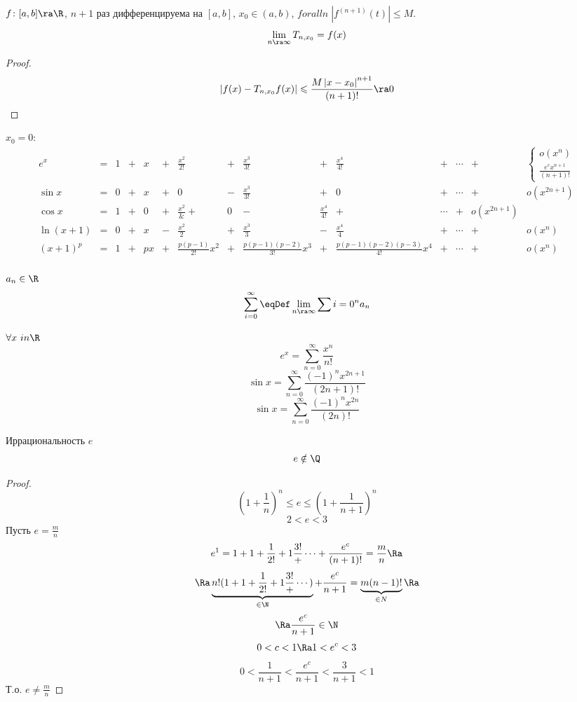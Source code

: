 \begin{conseq}
$f\colon [a, b] \ra \R$, $n+1$ раз дифференцируема на $[a, b]$, $x_0 \in (a, b)$, $forall n\; \left|f^{(n+1)} (t)\right| \leqslant M$.
$$\lim_{n\ra\infty} T_{n, x_0} = f(x)$$
\end{conseq}
\begin{proof}
$$\left|f(x) - T_{n, x_0} f(x)\right| \leqslant \frac{M \left|x-x_0\right|^{n+1}}{(n+1)!} \ra 0$$
\end{proof}

$x_0 = 0$:
$$
\begin{matrix}
e^x &=& 1 &+& x &+& \frac{x^2}{2!} &+& \frac{x^3}{3!} &+& \frac{x^4}{4!} &+& \cdots &+& \begin{cases}o(x^n) \\ \frac{e^cx^{n+1}}{(n+1)!}\end{cases} \\
\sin x &=& 0 &+& x &+& 0 &-& \frac{x^3}{3!} &+& 0 &+& \cdots &+& o(x^{2n+1}) \\
\cos x &=& 1 &+& 0 &+& \frac{x^2} &+& 0 &-& \frac{x^4}{4!} &+& \cdots &+& o(x^{2n+1}) \\

\ln (x+1) &=& 0 &+& x &-& \frac{x^2}2 &+& \frac{x^3}3 &-& \frac{x^4}4 &+& \cdots &+& o(x^n) \\
(x+1)^p &=& 1 &+& px &+& \frac{p(p-1)}{2!}x^2 &+& \frac{p(p-1)(p-2)}{3!}x^3 &+& \frac{p(p-1)(p-2)(p-3)}{4!}x^4 &+& \cdots &+& o(x^n) \\
\end{matrix}
$$

\begin{Def}
$a_n \in \R$
$$\sum_{i=0}^\infty \eqDef \lim_{n\ra\infty} \sum{i=0}^n a_n$$
\end{Def}

\begin{conseq}
$\forall x\ in \R\;$
$$e^x = \sum_{n=0}^\infty \frac{x^n}{n!}$$
$$\sin x = \sum_{n=0}^\infty \frac{(-1)^n x^{2n+1}}{(2n+1)!}$$
$$\sin x = \sum_{n=0}^\infty \frac{(-1)^n x^{2n}}{(2n)!}$$
\end{conseq}

\begin{theorem}{Иррациональность $e$}
$$e \notin \Q$$
\end{theorem}
\begin{proof}
$$\left(1+\frac1n\right)^n \leqslant e \leqslant \left(1+\frac1{n+1}\right)^n$$
$$2 < e < 3$$
Пусть $e = \frac{m}{n}$
$$e^1 = 1 + 1 + \frac1{2!} + 1\frac{3!} + \cdots + \frac{e^c}{(n+1)!} = \frac{m}{n} \Ra$$
$$\Ra \underbrace{n!(1 + 1 + \frac1{2!} + 1\frac{3!} + \cdots)}_{\in \N} + \frac{e^c}{n+1} = \underbrace{m(n-1)!}_{\in N} \Ra$$
$$\Ra \frac{e^c}{n+1} \in \N$$
$$0<c<1 \Ra 1 < e^c < 3$$
$$0 < \frac{1}{n+1} < \frac{e^c}{n+1} < \frac{3}{n + 1} < 1$$
Т.о. $e \ne \frac{m}{n}$
\end{proof}

